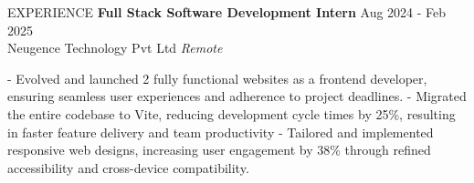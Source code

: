 \documentclass{resume} %
\begin{document}
\begin{rSection}{EXPERIENCE}
\textbf{Full Stack Software Development Intern} \hfill Aug 2024 - Feb 2025\\
Neugence Technology Pvt Ltd \hfill \textit{Remote}

- Evolved and launched 2 fully functional websites as a frontend developer, ensuring seamless user experiences and adherence to project deadlines.
- Migrated the entire codebase to Vite, reducing development cycle times by 25\%, resulting in faster feature delivery and team productivity
- Tailored and implemented responsive web designs, increasing user engagement by 38\% through refined accessibility and cross-device compatibility.

\end{rSection}


\end{document}
